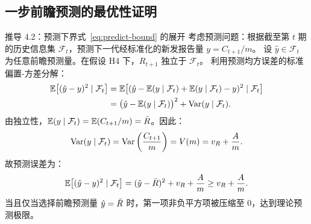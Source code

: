 \subsection{一步前瞻预测的最优性证明}

\begin{derivationbox}{推导 4.2：预测下界式~\eqref{eq:predict-bound} 的展开}
考虑预测问题：根据截至第 $t$ 期的历史信息集 $\mathcal{F}_t$，预测下一代经标准化的新发报告量 $y = C_{t+1}/m$。
设 $\hat{y} \in \mathcal{F}_t$ 为任意前瞻预测量。在假设 H4 下，$R_{t+1}$ 独立于 $\mathcal{F}_t$。
利用预测均方误差的标准偏置-方差分解：
\begin{align}
  \mathbb{E}\big[(\hat{y} - y)^2 \mid \mathcal{F}_t\big] &= \mathbb{E}\big[(\hat{y} - \mathbb{E}(y \mid \mathcal{F}_t) + \mathbb{E}(y \mid \mathcal{F}_t) - y)^2 \mid \mathcal{F}_t\big] \nonumber \\
  &= \big(\hat{y} - \mathbb{E}(y \mid \mathcal{F}_t)\big)^2 + \mathrm{Var}(y \mid \mathcal{F}_t).
\end{align}
由独立性，$\mathbb{E}(y \mid \mathcal{F}_t) = \mathbb{E}(C_{t+1}/m) = \bar{R}$。因此：
\begin{equation}
  \mathrm{Var}(y \mid \mathcal{F}_t) = \mathrm{Var}\left( \frac{C_{t+1}}{m} \right) = V(m) = v_R + \frac{A}{m}.
\end{equation}
故预测误差为：
\begin{equation}
  \mathbb{E}\big[(\hat{y} - y)^2 \mid \mathcal{F}_t\big] = (\hat{y} - \bar{R})^2 + v_R + \frac{A}{m} \ge v_R + \frac{A}{m}.
  \label{eq:predict-bound}
\end{equation}
当且仅当选择前瞻预测量 $\hat{y} = \bar{R}$ 时，第一项非负平方项被压缩至 0，达到理论预测极限。
\end{derivationbox}
